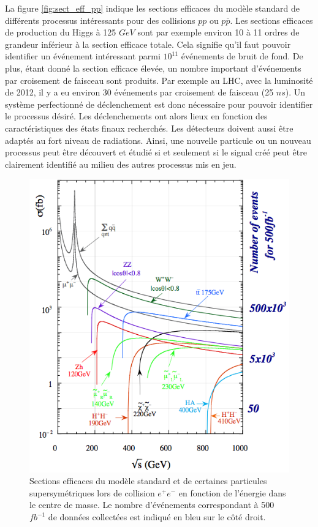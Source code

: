    La figure \ref{fig:sect_eff_pp} indique les sections efficaces du mod\`ele standard de diff\'erents processus int\'eressants pour des collisions $pp$ ou $p\overline{p}$. Les sections efficaces de production du Higgs \`a 125 $GeV$ sont par exemple environ 10 \`a 11 ordres de grandeur inf\'erieur \`a la section efficace totale. Cela signifie qu'il faut pouvoir identifier un \'ev\'enement int\'eressant parmi $10^{11}$ \'ev\'enements de bruit de fond. De plus, \'etant donn\'e la section efficace \'elev\'ee, un nombre important d'\'ev\'enements par croisement de faisceau sont produits. Par exemple au LHC, avec la luminosit\'e de 2012, il y a eu environ 30 \'ev\'enements par croisement de faisceau (25 $ns$). Un syst\`eme perfectionn\'e de d\'eclenchement est donc n\'ecessaire pour pouvoir identifier le processus d\'esir\'e. Les d\'eclenchements ont alors lieux en fonction des caract\'eristiques des \'etats finaux recherch\'es. Les d\'etecteurs doivent aussi \^etre adapt\'es au fort niveau de radiations. Ainsi, une nouvelle particule ou un nouveau processus peut \^etre d\'ecouvert et \'etudi\'e si et seulement si le signal cr\'e\'e peut \^etre clairement identifi\'e au milieu des autres processus mis en jeu.

  \begin{figure}[!htb]
    \begin{center} 
      \includegraphics[scale=0.45]{./figures/JLC_physics_xsections.png}
      \caption{Sections efficaces du mod\`ele standard et de certaines particules supersym\'etriques lors de collision $e^+ e^-$ en fonction de l'\'energie dans le centre de masse. Le nombre d'\'ev\'enements correspondant \`a 500 $fb^{-1}$ de donn\'ees collect\'ees est indiqu\'e en bleu sur le côt\'e droit.}
     \label{fig:sect_eff_ee}
     \end{center}
  \end{figure}
   

